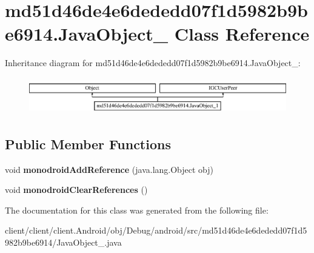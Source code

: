 \hypertarget{classmd51d46de4e6dededd07f1d5982b9be6914_1_1JavaObject__1}{}\section{md51d46de4e6dededd07f1d5982b9be6914.\+Java\+Object\+\_ Class Reference}
\label{classmd51d46de4e6dededd07f1d5982b9be6914_1_1JavaObject__1}
Inheritance diagram for md51d46de4e6dededd07f1d5982b9be6914.\+Java\+Object\+\_\+:\begin{figure}[H]
\begin{center}
\leavevmode
\includegraphics[height=1.613833cm]{classmd51d46de4e6dededd07f1d5982b9be6914_1_1JavaObject__1}
\end{center}
\end{figure}
\subsection*{Public Member Functions}
\begin{DoxyCompactItemize}
\item 
\hypertarget{classmd51d46de4e6dededd07f1d5982b9be6914_1_1JavaObject__1_acd28bbf491fde239559faa267e4bf523}{}void {\bfseries monodroid\+Add\+Reference} (java.\+lang.\+Object obj)\label{classmd51d46de4e6dededd07f1d5982b9be6914_1_1JavaObject__1_acd28bbf491fde239559faa267e4bf523}

\item 
\hypertarget{classmd51d46de4e6dededd07f1d5982b9be6914_1_1JavaObject__1_acda1195734a52881bef8d9616f15cc9e}{}void {\bfseries monodroid\+Clear\+References} ()\label{classmd51d46de4e6dededd07f1d5982b9be6914_1_1JavaObject__1_acda1195734a52881bef8d9616f15cc9e}

\end{DoxyCompactItemize}


The documentation for this class was generated from the following file\+:\begin{DoxyCompactItemize}
\item 
client/client/client.\+Android/obj/\+Debug/android/src/md51d46de4e6dededd07f1d5982b9be6914/Java\+Object\+\_.\+java\end{DoxyCompactItemize}
